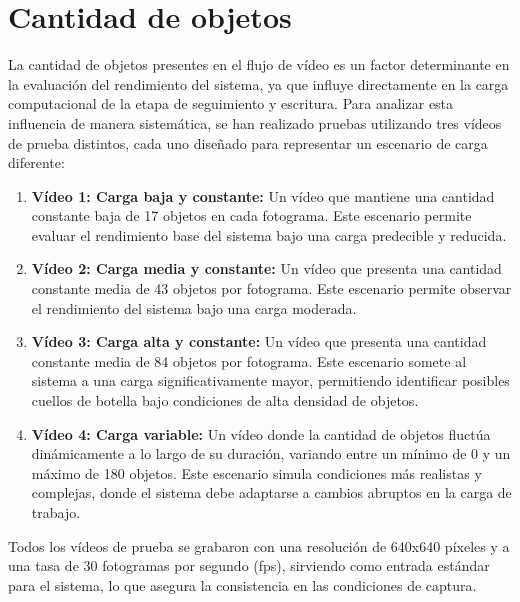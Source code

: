 \documentclass[11pt,spanish,listoffigures,listoftables]{tfgetsinf}
\begin{document}
\section{Cantidad de objetos} \label{sec:cantidad_objetos}
La cantidad de objetos presentes en el flujo de vídeo es un factor determinante en la evaluación del rendimiento del sistema, ya que influye directamente en la carga computacional de la etapa de seguimiento y escritura. Para analizar esta influencia de manera sistemática, se han realizado pruebas utilizando tres vídeos de prueba distintos, cada uno diseñado para representar un escenario de carga diferente:
\begin{enumerate}


   \item \textbf{Vídeo 1: Carga baja y constante:} Un vídeo que mantiene una cantidad constante baja de 17 objetos en cada fotograma. Este escenario permite evaluar el rendimiento base del sistema bajo una carga predecible y reducida.
   \item \textbf{Vídeo 2: Carga media y constante:} Un vídeo que presenta una cantidad constante media de 43 objetos por fotograma. Este escenario permite observar el rendimiento del sistema bajo una carga moderada.
   \item \textbf{Vídeo 3: Carga alta y constante:} Un vídeo que presenta una cantidad constante media de 84 objetos por fotograma. Este escenario somete al sistema a una carga significativamente mayor, permitiendo identificar posibles cuellos de botella bajo condiciones de alta densidad de objetos.
   \item \textbf{Vídeo 4: Carga variable:} Un vídeo donde la cantidad de objetos fluctúa dinámicamente a lo largo de su duración, variando entre un mínimo de 0 y un máximo de 180 objetos. Este escenario simula condiciones más realistas y complejas, donde el sistema debe adaptarse a cambios abruptos en la carga de trabajo.
\end{enumerate}
Todos los vídeos de prueba se grabaron con una resolución de 640x640 píxeles y a una tasa de 30 fotogramas por segundo (fps), sirviendo como entrada estándar para el sistema, lo que asegura la consistencia en las condiciones de captura.
\end{document}
